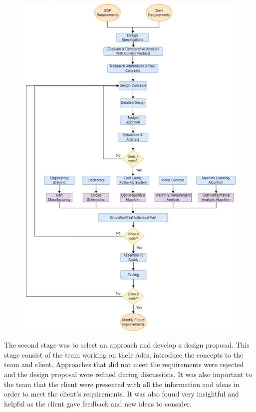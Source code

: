 \documentclass[11pt,landscape]{article}
\begin{document}
\begin{multicols}{3}
\begin{figure}[H]
    \begin{center}
        \includegraphics[]{design_process.png}
    \end{center}
    \label{fig:design_process}
\end{figure}

The second stage was to select an approach and develop a design proposal. This
stage consist of the team working on their roles, introduce the concepts to the
team and client. Approaches that did not meet the requirements were rejected and
the design proposal were refined during discussions. It was also important to
the team that the client were presented with all the information and ideas in
order to meet the client’s requirements. It was also found very insightful and
helpful as the client gave feedback and new ideas to consider. 


\end{multicols}
\end{document}
